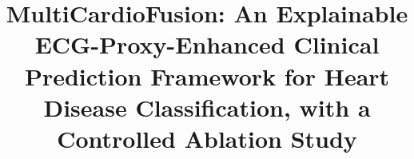 \documentclass[conference]{IEEEtran}
\begin{document}
\title{MultiCardioFusion: An Explainable ECG-Proxy-Enhanced Clinical Prediction Framework for Heart Disease Classification, with a Controlled Ablation Study}

\author{
}

\maketitle












\end{document}
